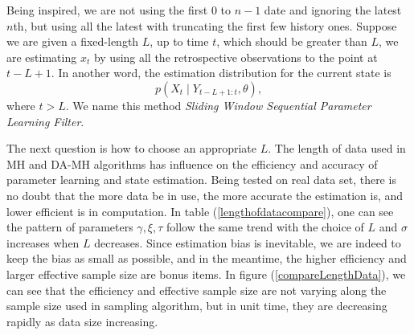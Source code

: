 Being inspired, we are not using the first $0$ to $n-1$ date and ignoring the latest $n$th, but using all the latest with truncating the first few history ones. Suppose we are given a fixed-length $L$, up to time $t$, which should be greater than $L$, we are estimating $x_t$ by using all the retrospective observations to the point at $t-L+1$. In another word, the estimation distribution for the current state is 
\begin{equation}
p(X_{t}\mid Y_{t-L+1:t},\theta),
\end{equation}
where $t>L$. We name this method \textit{Sliding Window Sequential Parameter Learning Filter}. 

The next question is how to choose an appropriate $L$. The length of data used in MH and DA-MH algorithms has influence on the efficiency and accuracy of parameter learning and state estimation. Being tested on real data set, there is no doubt that the more data be in use, the more accurate the estimation is, and lower efficient is in computation. In table (\ref{lengthofdatacompare}), one can see the pattern of parameters $\gamma,\xi,\tau$ follow the same trend with the choice of $L$ and $\sigma$ increases when $L$ decreases. Since estimation bias is inevitable, we are indeed to keep the bias as small as possible, and in the meantime, the higher efficiency and larger effective sample size are bonus items. In figure (\ref{compareLengthData}), we can see that the efficiency and effective sample size are not varying along the sample size used in sampling algorithm, but in unit time, they are decreasing rapidly as data size increasing. 
